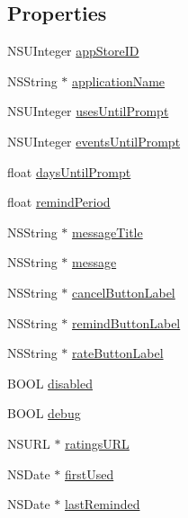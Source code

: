 \subsection*{\-Properties}
\begin{DoxyCompactItemize}
\item 
\-N\-S\-U\-Integer \hyperlink{interfacei_rate_a6f208a628a3abcf89f0ed81fcf882526}{app\-Store\-I\-D}
\item 
\-N\-S\-String $\ast$ \hyperlink{interfacei_rate_aff240528c39e893c83da5d944bff3cc6}{application\-Name}
\item 
\-N\-S\-U\-Integer \hyperlink{interfacei_rate_a8641dc4daba56be1959381184824c301}{uses\-Until\-Prompt}
\item 
\-N\-S\-U\-Integer \hyperlink{interfacei_rate_a9303cf2144f9eea3d71e88b4669de5eb}{events\-Until\-Prompt}
\item 
float \hyperlink{interfacei_rate_ab032507ffe53cf2f5e03cafd8ed26961}{days\-Until\-Prompt}
\item 
float \hyperlink{interfacei_rate_a1238723c7c839f38b31e1fa47165fef1}{remind\-Period}
\item 
\-N\-S\-String $\ast$ \hyperlink{interfacei_rate_a617c7701cce8eb33234eb7ccae2c8f71}{message\-Title}
\item 
\-N\-S\-String $\ast$ \hyperlink{interfacei_rate_ad5c562a7075414652c6e36ace5d1b6a5}{message}
\item 
\-N\-S\-String $\ast$ \hyperlink{interfacei_rate_a721285beee64d8dc94865c67fd6fc146}{cancel\-Button\-Label}
\item 
\-N\-S\-String $\ast$ \hyperlink{interfacei_rate_a264e838124d34df4335352e8024ac374}{remind\-Button\-Label}
\item 
\-N\-S\-String $\ast$ \hyperlink{interfacei_rate_aa1cc0a1b94c450a864368999ffe52260}{rate\-Button\-Label}
\item 
\-B\-O\-O\-L \hyperlink{interfacei_rate_a601e293895959dfa5f9741605c4fefc4}{disabled}
\item 
\-B\-O\-O\-L \hyperlink{interfacei_rate_a0be06187d1a928789b9db8254298829b}{debug}
\item 
\-N\-S\-U\-R\-L $\ast$ \hyperlink{interfacei_rate_a5bb8dbdef89893b1bf2dd9ef4706ffdf}{ratings\-U\-R\-L}
\item 
\-N\-S\-Date $\ast$ \hyperlink{interfacei_rate_a6bd5c93b5c9b7ca02eada47ff7f51670}{first\-Used}
\item 
\-N\-S\-Date $\ast$ \hyperlink{interfacei_rate_a2b732b06576b8841fd32f236fe305200}{last\-Reminded}
\item 

\end{DoxyCompactItemize}
